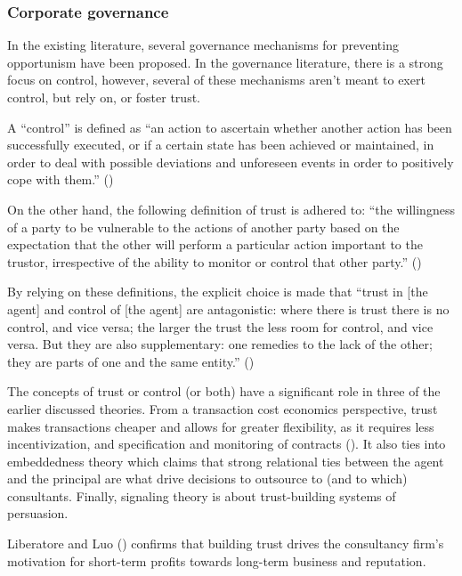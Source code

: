 \documentclass[
  man,floatsintext]{apa6}
\begin{document}
\subsubsection{Corporate governance}\label{corporate-governance}

In the existing literature, several governance mechanisms for preventing opportunism have been proposed. In the governance literature, there is a strong focus on control, however, several of these mechanisms aren't meant to exert control, but rely on, or foster trust.

A ``control'' is defined as ``an action to ascertain whether another action has been successfully executed, or if a certain state has been achieved or maintained, in order to deal with possible deviations and unforeseen events in order to positively cope with them.'' ()

On the other hand, the following definition of trust is adhered to: ``the willingness of a party to be vulnerable to the actions of another party based on the expectation that the other will perform a particular action important to the trustor, irrespective of the ability to monitor or control that other party.'' ()

By relying on these definitions, the explicit choice is made that ``trust in {[}the agent{]} and control of {[}the agent{]} are antagonistic: where there is trust there is no control, and vice versa; the larger the trust the less room for control, and vice versa. But they are also supplementary: one remedies to the lack of the other; they are parts of one and the same entity.'' ()

The concepts of trust or control (or both) have a significant role in three of the earlier discussed theories. From a transaction cost economics perspective, trust makes transactions cheaper and allows for greater flexibility, as it requires less incentivization, and specification and monitoring of contracts (). It also ties into embeddedness theory which claims that strong relational ties between the agent and the principal are what drive decisions to outsource to (and to which) consultants. Finally, signaling theory is about trust-building systems of persuasion.

Liberatore and Luo () confirms that building trust drives the consultancy firm's motivation for short-term profits towards long-term business and reputation.
\end{document}
